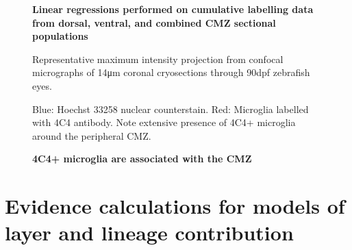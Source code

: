 \begin{figure}[!h]
    \caption{{\bf Linear regressions performed on cumulative labelling data from dorsal, ventral, and combined CMZ sectional populations}}
    \label{cumEdUlinreg}
\end{figure}


\begin{figure}[!h]
    \caption{{\bf 4C4+ microglia are associated with the CMZ}}
    Representative maximum intensity projection from confocal micrographs of 14\si{\micro\metre} coronal cryosections through 90dpf zebrafish eyes.
    
    Blue: Hoechst 33258 nuclear counterstain. Red: Microglia labelled with 4C4 antibody. Note extensive presence of 4C4+ microglia around the peripheral CMZ.
    \label{4C4micrograph}
\end{figure}

\FloatBarrier

\section{Evidence calculations for models of layer and lineage contribution}
\FloatBarrier

